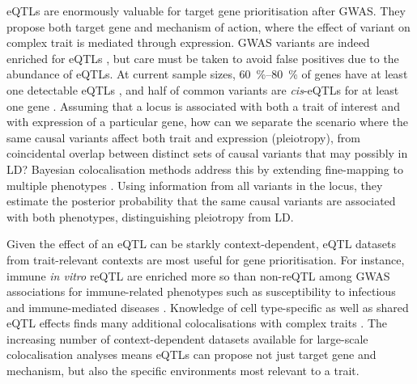 \begin{outline}
\glspl{eQTL} are enormously valuable for target gene prioritisation after \gls{GWAS}.
They propose both target gene and mechanism of action, where the effect of variant on complex trait is mediated through expression.
\Gls{GWAS} variants are indeed enriched for \glspl{eQTL} \autocite{nicolae2010TraitAssociatedSNPsAre}, but care must be taken to avoid false positives due to the abundance of \glspl{eQTL}.
At current sample sizes, \SIrange{60}{80}{\percent} of genes have at least one detectable \glspl{eQTL} \autocite{vandiedonck2017GeneticAssociationMolecular,vosa2018UnravelingPolygenicArchitecture},
and half of common variants are \textit{cis}-\glspl{eQTL} for at least one gene \autocite{liu2019AbundantAssociationsGene}.
Assuming that a locus is associated with both a trait of interest and with expression of a particular gene,
how can we separate the scenario where the same causal variants affect both trait and expression (pleiotropy),
from coincidental overlap between distinct sets of causal variants that may possibly in \gls{LD}?
Bayesian colocalisation methods address this by extending fine-mapping to multiple phenotypes \autocite{burgess2018InferringCausalRelationships,wallace2020ElicitingPriorsRelaxing,hukku2020ProbabilisticColocalizationGenetic}.
Using information from all variants in the locus, 
they estimate the posterior probability that the same causal variants are associated with both phenotypes,
distinguishing pleiotropy from \gls{LD}.

Given the effect of an \gls{eQTL} can be starkly context-dependent, 
\gls{eQTL} datasets from trait-relevant contexts are most useful for gene prioritisation.
For instance, immune \textit{in vitro} \gls{reQTL} are enriched more so than non-\gls{reQTL} among \gls{GWAS} associations for immune-related phenotypes such as
susceptibility to infectious \autocite{barreiro2012DecipheringGeneticArchitecture,manry2017DecipheringGeneticControl}
and immune-mediated diseases \autocite{manry2017DecipheringGeneticControl,kim-hellmuth2017GeneticRegulatoryEffects}.
Knowledge of cell type-specific as well as shared \gls{eQTL} effects 
finds many additional colocalisations with complex traits \autocite{kundu2020GeneticAssociationsRegulatory,kim-hellmuth2020CellTypeSpecific}.
The increasing number of context-dependent datasets available for large-scale colocalisation analyses means \glspl{eQTL} can propose not just target gene and mechanism, but also the specific environments most relevant to a trait.


\end{outline}
